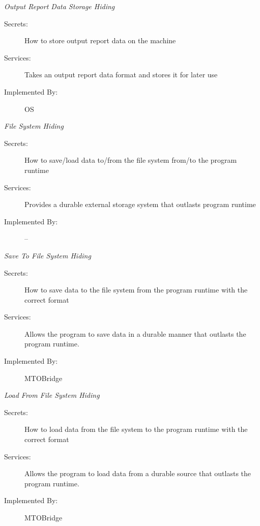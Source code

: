 \documentclass[12pt, titlepage]{article}
\begin{document}
      \hypertarget{ORDSH}{\emph{{\large Output Report Data Storage Hiding}}}
    \begin{description}
        \item[Secrets:] How to store output report data on the machine
        \item[Services:]Takes an output report data format and stores it for later use
        \item[Implemented By:] OS\\
    \end{description}
      \hypertarget{FSH}{\emph{{\large File System Hiding}}}
    \begin{description}
        \item[Secrets:]How to save/load data to/from the file system from/to the program runtime
        \item[Services:]Provides a durable external storage system that outlasts program runtime
        \item[Implemented By:] --\\
    \end{description}
      \hypertarget{STFSH}{\emph{{\large Save To File System Hiding}}}
    \begin{description}
        \item[Secrets:]How to save data to the file system from the program runtime with the correct format 
        \item[Services:] Allows the program to save data in a durable manner that outlasts the program runtime.
        \item[Implemented By:] MTOBridge\\
    \end{description}
      \hypertarget{LFFSH}{\emph{{\large Load From File System Hiding}}}
    \begin{description}
        \item[Secrets:]How to load data from the file system to the program runtime with the correct format
        \item[Services:]Allows the program to load data from a durable source that outlasts the program runtime.
        \item[Implemented By:] MTOBridge\\
    \end{description}
    
        
\end{document}
